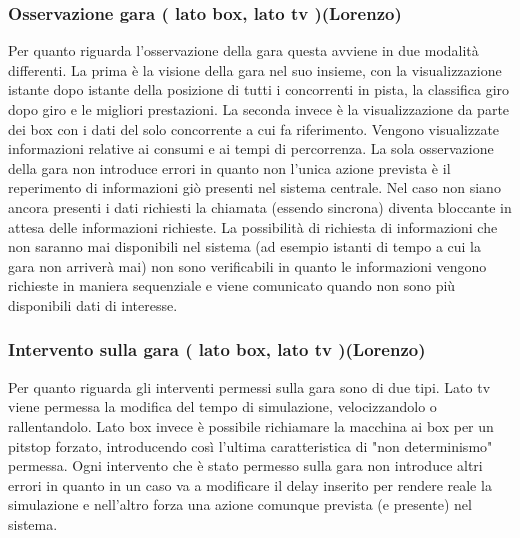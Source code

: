 \subsubsection{Osservazione gara ( lato box, lato tv )(Lorenzo)}
Per quanto riguarda l'osservazione della gara questa avviene in due modalità differenti. La prima è la visione della gara nel suo insieme, con la visualizzazione istante dopo istante della posizione di tutti i concorrenti in pista, la classifica giro dopo giro e le migliori prestazioni. La seconda invece è la visualizzazione da parte dei box con i dati del solo concorrente a cui fa riferimento. Vengono visualizzate informazioni relative ai consumi e ai tempi di percorrenza. La sola osservazione della gara non introduce errori in quanto non l'unica azione prevista è il reperimento di informazioni giò presenti nel sistema centrale. Nel caso non siano ancora presenti i dati richiesti la chiamata (essendo sincrona) diventa bloccante in attesa delle informazioni richieste. La possibilità di richiesta di informazioni che non saranno mai disponibili nel sistema (ad esempio istanti di tempo a cui la gara non arriverà mai) non sono verificabili in quanto le informazioni vengono richieste in maniera sequenziale e viene comunicato quando non sono più disponibili dati di interesse.
\subsubsection{Intervento sulla gara ( lato box, lato tv )(Lorenzo)}
Per quanto riguarda gli interventi permessi sulla gara sono di due tipi. Lato tv viene permessa la modifica del tempo di simulazione, velocizzandolo o rallentandolo. Lato box invece è possibile richiamare la macchina ai box per un pitstop forzato, introducendo così l'ultima caratteristica di "non determinismo" permessa.
Ogni intervento che è stato permesso sulla gara non introduce altri errori in quanto in un caso va a modificare il delay inserito per rendere reale la simulazione e nell'altro forza una azione comunque prevista (e presente) nel sistema. 
